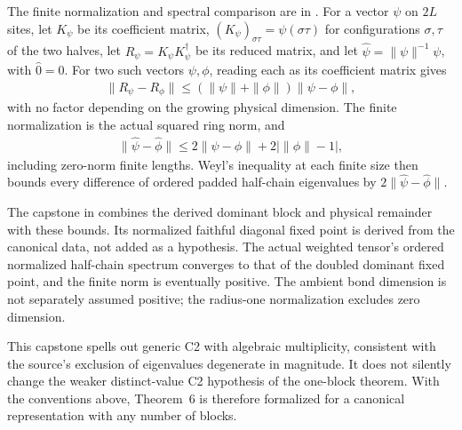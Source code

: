 \documentclass{article}
\begin{document}
The finite normalization and spectral comparison are in
.
For a vector $\psi$ on $2L$ sites, let $K_\psi$ be its coefficient matrix,
$(K_\psi)_{\sigma\tau}=\psi(\sigma\tau)$ for configurations $\sigma,\tau$
of the two halves, let $R_\psi=K_\psi K_\psi^\dagger$ be its reduced matrix,
and let $\widehat\psi=\|\psi\|^{-1}\psi$, with $\widehat0=0$. For two such
vectors $\psi,\phi$, reading each as its coefficient matrix gives
\begin{align}
    \|R_\psi-R_\phi\|
    \leq(\|\psi\|+\|\phi\|)\|\psi-\phi\|,
    \label{eq:halfchain_note_reduced_stability}
\end{align}
with no factor depending on the growing physical dimension. The finite
normalization is the actual squared ring norm, and
\begin{align}
    \|\widehat\psi-\widehat\phi\|
    \leq2\|\psi-\phi\|+2\bigl|\|\phi\|-1\bigr|,
    \label{eq:halfchain_note_normalized_remainder}
\end{align}
including zero-norm finite lengths. Weyl's inequality at each finite size
then bounds every difference of ordered padded half-chain eigenvalues by
$2\|\widehat\psi-\widehat\phi\|$.

The capstone
in 
combines the derived dominant block and physical remainder with these
bounds. Its normalized faithful diagonal fixed point is derived from the
canonical data, not added as a hypothesis. The actual weighted tensor's
ordered normalized half-chain spectrum converges to that of the doubled
dominant fixed point, and the finite norm is eventually positive. The
ambient bond dimension is not separately assumed positive; the radius-one
normalization excludes zero dimension.

This capstone spells out generic C2 with algebraic multiplicity, consistent
with the source's exclusion of eigenvalues degenerate in magnitude. It
does not silently change the weaker distinct-value C2 hypothesis of the
one-block theorem. With the conventions above, Theorem~6 is therefore
formalized for a canonical representation with any number of blocks.



\end{document}
